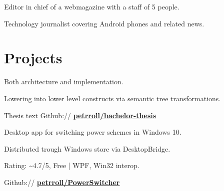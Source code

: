 \documentclass[a4paper]{deedy-resume} %
\begin{document}
\begin{minipage}[t]{0.62\textwidth}

\begin{tightitemize}
\item Editor in chief of a webmagazine with a staff of 5 people.
\item Technology journalist covering Android phones and related news.
\end{tightitemize}


\sectionspace %


\section{Projects}

\begin{tightitemize}
\item Both architecture and implementation.
\item Lowering into lower level constructs via semantic tree transformations.
\item Thesis text Github:// \href{https://github.com/petrroll/bachelor-thesis}{\bf petrroll/bachelor-thesis}
\end{tightitemize}
\sectionspace %


\emptyLocation %
\begin{tightitemize}
\item Desktop app for switching power schemes in Windows 10.
\item Distributed trough Windows store via DesktopBridge.
\item Rating: \textasciitilde4.7/5, Free | WPF, Win32 interop.
\item Github:// \href{https://github.com/petrroll/PowerSwitcher}{\bf petrroll/PowerSwitcher}
\end{tightitemize}

\sectionspace %



\end{minipage}
\end{document}
